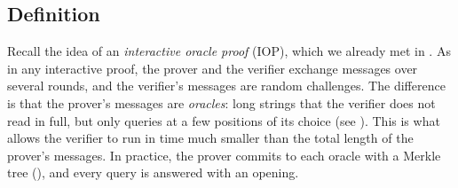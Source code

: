 \documentclass[../../book]{subfiles}
\begin{document}
\subsection{Definition}

Recall the idea of an \emph{interactive oracle proof} (IOP), which we already met in . %
As in any interactive proof, the prover and the verifier exchange messages over several rounds, and the verifier's messages are random challenges.
The difference is that the prover's messages are \emph{oracles}: long strings that the verifier does not read in full, but only queries at a few positions of its choice (see ).
This is what allows the verifier to run in time much smaller than the total length of the prover's messages.
In practice, the prover commits to each oracle with a Merkle tree (), and every query is answered with an opening.
\end{document}

